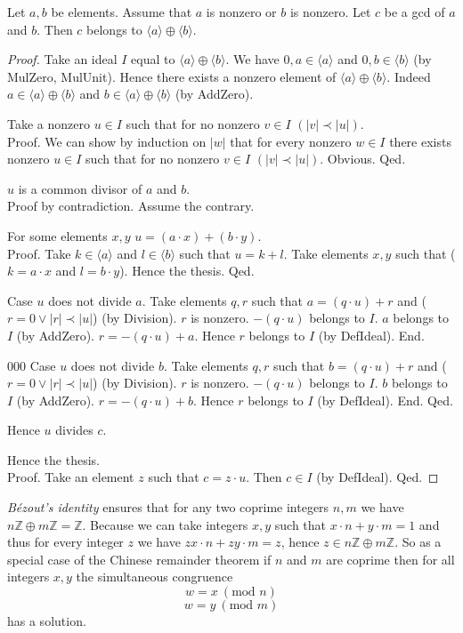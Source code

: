 \documentclass{article}
\renewcommand{\mod}{\text{mod }}
\newcommand{\Int}{\mathbb{Z}}
\begin{document}
  \begin{forthel}
    \begin{theorem}[GCDin]
      Let $a,b$ be elements. Assume that $a$ is nonzero or $b$ is nonzero. Let $c$ be a gcd of $a$ and $b$. Then $c$ belongs to $\langle a \rangle \oplus \langle b \rangle$.
    \end{theorem}
    \begin{proof}
      Take an ideal $I$ equal to $\langle a \rangle \oplus \langle b \rangle$. We have $0,a \in \langle a \rangle$ and $0,b \in \langle b \rangle$ (by MulZero, MulUnit). Hence there exists a nonzero element of $\langle a \rangle \oplus \langle b \rangle$. Indeed $a \in \langle a \rangle \oplus \langle b \rangle$ and $b \in \langle a \rangle \oplus \langle b \rangle$ (by AddZero).

      Take a nonzero $u \in I$ such that for no nonzero $v \in I$ $(|v| \prec |u|)$. \\
      Proof.
        We can show by induction on $|w|$ that for every nonzero $w \in I$ there
          exists nonzero $u \in I$ such that for no nonzero $v \in I$ $(|v| \prec |u|)$.
        Obvious.
      Qed.

      $u$ is a common divisor of $a$ and $b$. \\
      Proof by contradiction.
        Assume the contrary.

        For some elements $x,y$ $u = (a \cdot x) + (b \cdot y)$. \\
        Proof.
          Take $k \in \langle a \rangle$ and $l \in \langle b \rangle$ such that $u = k + l$. Take elements $x,y$ such that ($k = a \cdot x$ and $l = b \cdot y$). Hence the thesis.
        Qed.

        Case $u$ does not divide $a$.
          Take elements $q,r$ such that $a = (q \cdot u) + r$ and ($r = 0 \vee |r| \prec |u|$) (by Division). $r$ is nonzero. $- (q \cdot u)$ belongs to $I$. $a$ belongs to $I$ (by AddZero). $r = - (q \cdot u) + a$. Hence $r$ belongs to $I$ (by DefIdeal).
        End.

   000      Case $u$ does not divide $b$.
          Take elements $q,r$ such that $b = (q \cdot u) + r$ and ($r = 0 \vee |r| \prec |u|$) (by Division). $r$ is nonzero. $- (q \cdot u)$ belongs to $I$. $b$ belongs to $I$ (by AddZero). $r = - (q \cdot u) + b$. Hence $r$ belongs to $I$ (by DefIdeal).
        End.
      Qed.

      Hence $u$ divides $c$.

      Hence the thesis. \\
      Proof.
        Take an element $z$ such that $c = z \cdot u$. Then $c \in I$ (by DefIdeal).
      Qed.
    \end{proof}
  \end{forthel}

  \textit{Bézout's identity} ensures that for any two coprime integers $n,m$ we have $n \Int \oplus m \Int = \Int$. Because we can take integers $x,y$ such that $x \cdot n + y \cdot m = 1$ and thus for every integer $z$ we have $zx \cdot n + zy \cdot m = z$, hence $z \in n \Int \oplus m \Int$. So as a special case of the Chinese remainder theorem if $n$ and $m$ are coprime then for all integers $x,y$ the simultaneous congruence
  $$w = x ~(\mod n)$$
  $$w = y ~(\mod m)$$
  has a solution.
\end{document}

